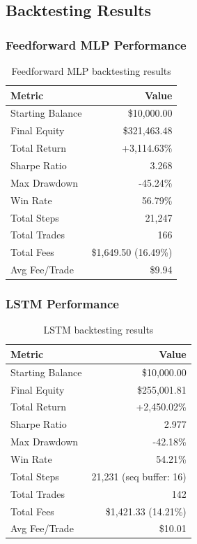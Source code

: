 \documentclass[12pt,a4paper]{article}
\begin{document}
\subsection{Backtesting Results}

\subsubsection{Feedforward MLP Performance}
\begin{table}[H]
\centering
\begin{tabular}{lr}
\toprule
\textbf{Metric} & \textbf{Value} \\
\midrule
Starting Balance & \$10,000.00 \\
Final Equity & \$321,463.48 \\
Total Return & +3,114.63\% \\
Sharpe Ratio & 3.268 \\
Max Drawdown & -45.24\% \\
Win Rate & 56.79\% \\
\midrule
Total Steps & 21,247 \\
Total Trades & 166 \\
Total Fees & \$1,649.50 (16.49\%) \\
Avg Fee/Trade & \$9.94 \\
\bottomrule
\end{tabular}
\caption{Feedforward MLP backtesting results}
\end{table}

\subsubsection{LSTM Performance}
\begin{table}[H]
\centering
\begin{tabular}{lr}
\toprule
\textbf{Metric} & \textbf{Value} \\
\midrule
Starting Balance & \$10,000.00 \\
Final Equity & \$255,001.81 \\
Total Return & +2,450.02\% \\
Sharpe Ratio & 2.977 \\
Max Drawdown & -42.18\% \\
Win Rate & 54.21\% \\
\midrule
Total Steps & 21,231 (seq buffer: 16) \\
Total Trades & 142 \\
Total Fees & \$1,421.33 (14.21\%) \\
Avg Fee/Trade & \$10.01 \\
\bottomrule
\end{tabular}
\caption{LSTM backtesting results}
\end{table}
\end{document}
